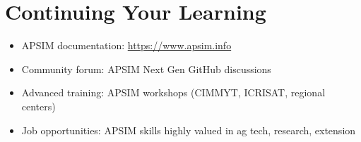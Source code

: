 \section{Continuing Your Learning}

\begin{itemize}
  \item APSIM documentation: \url{https://www.apsim.info}
  \item Community forum: APSIM Next Gen GitHub discussions
  \item Advanced training: APSIM workshops (CIMMYT, ICRISAT, regional centers)
  \item Job opportunities: APSIM skills highly valued in ag tech, research, extension
\end{itemize}

